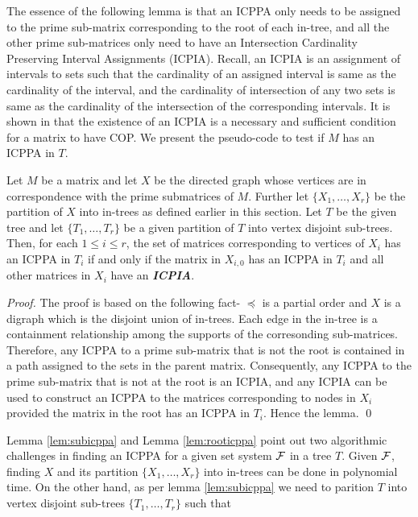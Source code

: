 \documentclass{llncs}
\def\cF{{\cal F}}
\begin{document}
 The essence of the following lemma is that an ICPPA only needs to be
 assigned to the prime sub-matrix corresponding to the root of each
 in-tree, and all the other prime sub-matrices only need to have an
 Intersection Cardinality Preserving Interval Assignments (ICPIA).
 Recall, an ICPIA is an assignment of intervals to sets such that the
 cardinality of an assigned interval is same as the cardinality of the
 interval, and the cardinality of intersection of any two sets is same
 as the cardinality of the intersection of the corresponding
 intervals.  It is shown in \cite{nsnrs09} that the existence of an
 ICPIA is a necessary and sufficient condition for a matrix to have
 COP.  
We present the pseudo-code to test if $M$ has an ICPPA in $T$. 
\begin{lemma} \label{lem:rooticppa}
Let $M$ be a matrix and let $X$ be the directed graph whose vertices
are in correspondence with the prime submatrices of $M$.  Further let
$\{X_1,\ldots,X_r\}$ be the partition of $X$ into in-trees as defined
earlier in this section. 
Let $T$ be the given tree and let $\{T_1, \ldots, T_r\}$ be a given
partition of $T$ into vertex disjoint sub-trees. 
Then, for each $1 \leq i \leq r$, the set of matrices corresponding to
vertices of $X_i$ has an ICPPA in $T_i$ if and only if the matrix in
$X_{i,0}$ has an ICPPA in $T_i$ and all other matrices in $X_i$ have
an {\bf {\em ICPIA}}. 
\end{lemma}
\begin{proof}
The proof is based on the following fact- $\preccurlyeq$ is a partial
order and $X$ is a digraph which is the disjoint 
union of in-trees.  Each edge in the in-tree is a containment
relationship among the supports of the corresonding
sub-matrices. Therefore, any ICPPA to a prime sub-matrix that is not
the root is contained in a path assigned to the sets in the parent
matrix.  Consequently, any ICPPA to the prime sub-matrix that is not
at the root is an ICPIA, and any ICPIA can be used to construct an
ICPPA to the matrices corresponding to nodes in $X_i$ provided the
matrix in the root has an ICPPA in $T_i$.   Hence the lemma. \qed
\end{proof}
Lemma \ref{lem:subicppa} and Lemma \ref{lem:rooticppa} point out two
algorithmic challenges in finding an ICPPA for a given set system
$\cF$ in a tree $T$.  Given $\cF$, finding $X$ and its partition
$\{X_1,\ldots,X_r\}$ into in-trees can be done in polynomial time.  On
the other hand, as per lemma \ref{lem:subicppa} we need to parition
$T$ into vertex disjoint sub-trees $\{T_1, \ldots, T_r\}$ such that
\end{document}
